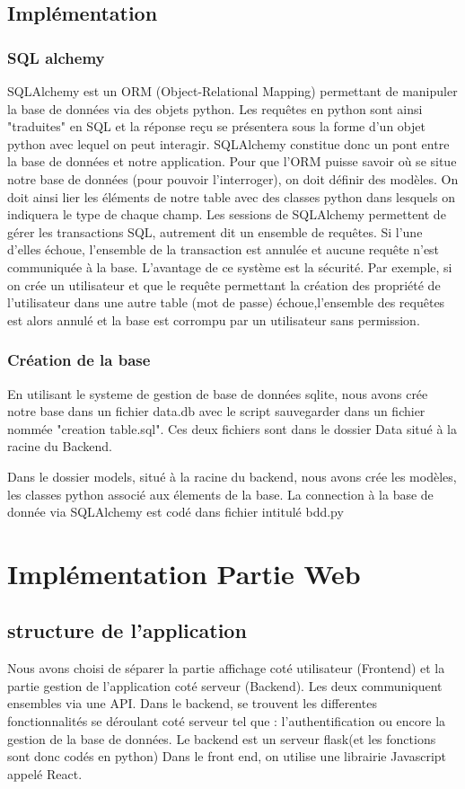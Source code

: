 \documentclass[french,a4paper]{article}
\begin{document}
\subsection{Implémentation}
\subsubsection{SQL alchemy}
SQLAlchemy est un ORM (Object-Relational Mapping) permettant de manipuler la base de données via des objets python. Les requêtes en 
python sont ainsi "traduites" en SQL et la réponse reçu se présentera sous la forme d’un objet python avec lequel on peut interagir.
SQLAlchemy constitue donc un pont entre la base de données et notre application. Pour que l’ORM puisse savoir où se situe notre 
base de données (pour pouvoir l’interroger), on doit définir des modèles. 
On doit ainsi lier les éléments de notre table avec des classes python dans lesquels on indiquera le type de chaque champ. 
Les sessions de SQLAlchemy permettent de gérer les transactions SQL, autrement dit un ensemble de requêtes. Si l'une d'elles échoue,
l'ensemble de la transaction est annulée et aucune requête n'est communiquée à la base. L’avantage de ce système est la sécurité. 
Par exemple, si on crée un utilisateur et que le requête permettant la création des propriété de l’utilisateur dans une autre table 
(mot de passe) échoue,l’ensemble des requêtes est alors annulé et la base est corrompu par un utilisateur sans permission.

\subsubsection{Création de la base}
En utilisant le systeme de gestion de base de données sqlite, nous avons crée notre base dans un fichier data.db avec le script 
sauvegarder dans un fichier nommée "creation table.sql". Ces deux fichiers sont dans le dossier Data situé à la racine du Backend.  

Dans le dossier models, situé à la racine du backend, nous avons crée les modèles, les classes python associé aux élements de la base. 
La connection à la base de donnée via SQLAlchemy est codé dans fichier intitulé bdd.py

\newpage
\section{Implémentation Partie Web}
\subsection{structure de l'application}
Nous avons choisi de séparer la partie affichage coté utilisateur (Frontend) et la partie gestion de l'application coté serveur (Backend).
Les deux communiquent ensembles via une API. 
Dans le backend, se trouvent les differentes fonctionnalités se déroulant coté serveur tel que : l'authentification ou encore la gestion 
de la base de données. Le backend est un serveur flask(et les fonctions sont donc codés en python)
Dans le front end, on utilise une librairie Javascript appelé React.
\end{document}
